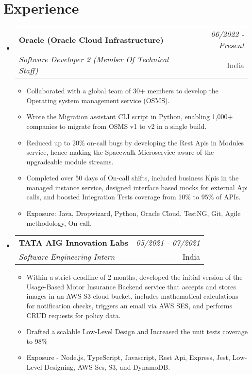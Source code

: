 \documentclass[a4paper,12pt]{article}
\makeatletter
\newcommand{\resumeSubheading}[4]{
\vspace{0.5mm}\item[]
    \begin{tabular*}{0.98\textwidth}[t]{l@{\extracolsep{\fill}}r}
        \textbf{#1} & \textit{\footnotesize{#4}} \\
        \textit{\footnotesize{#3}} &  \footnotesize{#2}\\
    \end{tabular*}
    \vspace{-1.0mm}
}
\newcommand{\resumeSubHeadingListStart}{\begin{itemize}[leftmargin=*,labelsep=0mm]}
\newcommand{\resumeItemListStart}{\begin{justify}\begin{itemize}[leftmargin=3ex, rightmargin=2ex, noitemsep,labelsep=1.2mm,itemsep=0.8mm]\small}
\newcommand{\resumeSubHeadingListEnd}{\end{itemize}\vspace{2mm}}
\newcommand{\resumeItemListEnd}{\end{itemize}\end{justify}\vspace{-2mm}}
\makeatother
\begin{document}
\section{\textbf{Experience}}
  \resumeSubHeadingListStart
    \resumeSubheading
      {Oracle (Oracle Cloud Infrastructure)}{India}
      {Software Developer 2 (Member Of Technical Staff)}{06/2022 - Present}
      \vspace{-2.0mm}
      \resumeItemListStart
    \item {Collaborated with a global team of 30+ members to develop the Operating system management service (OSMS).}
    \item {Wrote the Migration assistant CLI script in Python, enabling 1,000+ companies to migrate from OSMS v1 to v2 in a single build.}
    \item {Reduced up to 20\% on-call bugs by developing the Rest Apis in Modules service, hence making the Spacewalk Microservice aware of the upgradeable module streams.}
    \item {Completed over 50 days of On-call shifts, included business Kpis in the managed instance service, designed interface based mocks for external Api calls, and boosted Integration Tests coverage from 10\% to 95\% of APIs.}
    \item {Exposure: Java, Dropwizard, Python, Oracle Cloud, TestNG, Git, Agile methodology, On-call.}
    \resumeItemListEnd
    
    \vspace{-0.5mm}
    
    \resumeSubheading
      {TATA AIG Innovation Labs}{India}
      {Software Engineering Intern}{05/2021 - 07/2021}
      \vspace{-2.0mm}
      \resumeItemListStart
    \item {Within a strict deadline of 2 months, developed the initial version of the Usage-Based Motor Insurance Backend service that accepts and stores images in an AWS S3 cloud bucket, includes mathematical calculations for notification checks, triggers an email via AWS SES, and performs CRUD requests for policy data.}
    \item {Drafted a scalable Low-Level Design and Increased the unit tests coverage to 98\%}
    \item {Exposure - Node.js, TypeScript, Javascript, Rest Api, Express, Jest, Low-Level Designing, AWS Ses, S3, and DynamoDB.}
    \resumeItemListEnd
      
  \resumeSubHeadingListEnd
\vspace{-6mm}
\end{document}
